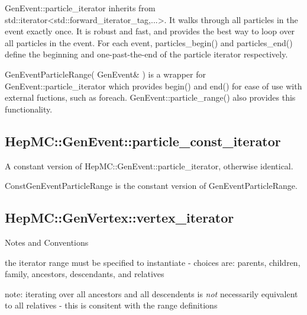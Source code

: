 \documentclass[11pt,letterpaper]{article}
\begin{document}
GenEvent::particle\_iterator inherits from 
std::iterator<std::forward\_iterator\_tag,...>.
It walks through all particles in the
event exactly once. It is robust and fast, and provides the best way
to loop over all particles in the event. For each event,
particles\_begin() and particles\_end() define the beginning and
one-past-the-end of the particle iterator respectively.

GenEventParticleRange( GenEvent\& ) is a wrapper for
GenEvent::particle\_iterator which provides begin() and end() for
ease of use with external fuctions, such as foreach.
GenEvent::particle\_range() also provides this functionality.

%
%

\subsection{HepMC::GenEvent::particle\_const\_iterator}

A constant version of HepMC::GenEvent::particle\_iterator, otherwise
identical.

ConstGenEventParticleRange is the constant version of GenEventParticleRange.

%
%

\subsection{HepMC::GenVertex::vertex\_iterator}
\begin{myitemize}{Notes and Conventions}
  \item the iterator range must be specified to instantiate -
    choices are: parents, children, family, ancestors, descendants,
    and relatives
  \item note: iterating over all ancestors and all descendents is {\it
      not} necessarily equivalent to all relatives - this is consitent
    with the range definitions
\end{myitemize}
\end{document}
